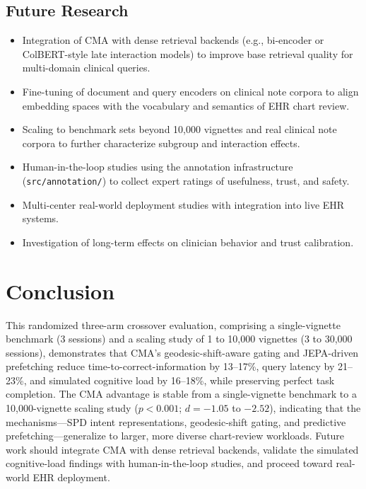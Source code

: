 \documentclass[preprint,12pt]{elsarticle}
\begin{document}
\subsection{Future Research}
\begin{itemize}
  \item Integration of CMA with dense retrieval backends (e.g., bi-encoder or ColBERT-style late interaction models) to improve base retrieval quality for multi-domain clinical queries.
  \item Fine-tuning of document and query encoders on clinical note corpora to align embedding spaces with the vocabulary and semantics of EHR chart review.
  \item Scaling to benchmark sets beyond 10{,}000 vignettes and real clinical note corpora to further characterize subgroup and interaction effects.
  \item Human-in-the-loop studies using the annotation infrastructure (\texttt{src/annotation/}) to collect expert ratings of usefulness, trust, and safety.
  \item Multi-center real-world deployment studies with integration into live EHR systems.
  \item Investigation of long-term effects on clinician behavior and trust calibration.
\end{itemize}

\section{Conclusion}

This randomized three-arm crossover evaluation, comprising a single-vignette benchmark (3 sessions) and a scaling study of 1 to 10{,}000 vignettes (3 to 30{,}000 sessions), demonstrates that CMA's geodesic-shift-aware gating and JEPA-driven prefetching reduce time-to-correct-information by 13--17\%, query latency by 21--23\%, and simulated cognitive load by 16--18\%, while preserving perfect task completion. The CMA advantage is stable from a single-vignette benchmark to a 10{,}000-vignette scaling study ($p < 0.001$; $d = -1.05$ to $-2.52$), indicating that the mechanisms---SPD intent representations, geodesic-shift gating, and predictive prefetching---generalize to larger, more diverse chart-review workloads. Future work should integrate CMA with dense retrieval backends, validate the simulated cognitive-load findings with human-in-the-loop studies, and proceed toward real-world EHR deployment.



\end{document}
